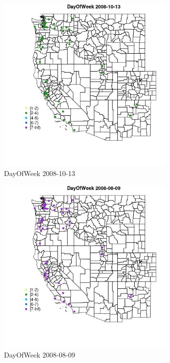 \begin{figure} 
\centering  
\includegraphics[width=0.77\textwidth]{Code_Outputs/Report_ML_input_PM25_Step4_part_e_de_duplicated_aves_MapObsDayOfWeek2008-10-13.jpg} 
\caption{\label{fig:Report_ML_input_PM25_Step4_part_e_de_duplicated_avesMapObsDayOfWeek2008-10-13}DayOfWeek 2008-10-13} 
\end{figure} 
 

\begin{figure} 
\centering  
\includegraphics[width=0.77\textwidth]{Code_Outputs/Report_ML_input_PM25_Step4_part_e_de_duplicated_aves_MapObsDayOfWeek2008-08-09.jpg} 
\caption{\label{fig:Report_ML_input_PM25_Step4_part_e_de_duplicated_avesMapObsDayOfWeek2008-08-09}DayOfWeek 2008-08-09} 
\end{figure} 
 

